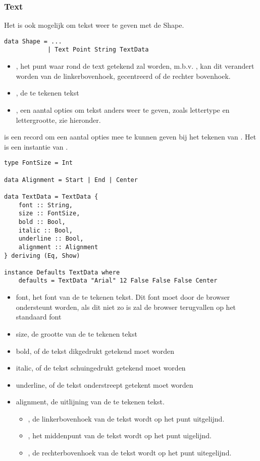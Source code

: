 \subsubsection{Text}
Het is ook mogelijk om tekst weer te geven met de  Shape.
\begin{lstlisting}
data Shape = ...
			| Text Point String TextData
\end{lstlisting} 
\begin{itemize}
	\item {}, het punt waar rond de text getekend zal worden, m.b.v. , kan dit verandert worden van de linkerbovenhoek, gecentreerd of de rechter bovenhoek.
	\item {}, de te tekenen tekst
	\item {}, een aantal opties om tekst anders weer te geven, zoals lettertype en lettergrootte, zie hieronder.
\end{itemize}

 is een record om een aantal opties mee te kunnen geven bij het tekenen van . Het is een instantie van .
\begin{lstlisting}
type FontSize = Int

data Alignment = Start | End | Center

data TextData = TextData {
    font :: String,
    size :: FontSize,
    bold :: Bool,
    italic :: Bool,
    underline :: Bool,
    alignment :: Alignment
} deriving (Eq, Show)

instance Defaults TextData where
    defaults = TextData "Arial" 12 False False False Center
\end{lstlisting}
\begin{itemize}
	\item font, het font van de te tekenen tekst. Dit font moet door de browser ondersteunt worden, als dit niet zo is zal de browser terugvallen op het standaard font
	\item size, de grootte van de te tekenen tekst
	\item bold, of de tekst dikgedrukt getekend moet worden
	\item italic, of de tekst schuingedrukt getekend moet worden
	\item underline, of de tekst onderstreept getekent moet worden
	\item alignment, de uitlijning van de te tekenen tekst. 
		\begin{itemize}
			\item {}, de linkerbovenhoek van de tekst wordt op het punt uitgelijnd.
			\item {}, het middenpunt van de tekst wordt op het punt uigelijnd.
			\item {}, de rechterbovenhoek van de tekst wordt op het punt uitegelijnd.
		\end{itemize}
\end{itemize}

